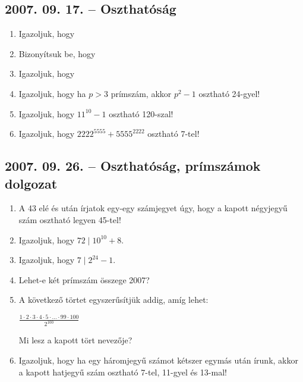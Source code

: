 \subsection*{2007. 09. 17. -- Oszthatóság}
\begin{enumerate}
\item Igazoljuk, hogy
\item Bizonyítsuk be, hogy
\item Igazoljuk, hogy
\item Igazoljuk, hogy ha $p>3$ prímszám, akkor $p^2-1$ osztható 24-gyel!
\item Igazoljuk, hogy $11^{10}-1$ osztható 120-szal!
\item Igazoljuk, hogy $2222^{5555}+5555^{2222}$ osztható 7-tel!
\end{enumerate}


\subsection*{2007. 09. 26. -- Oszthatóság, prímszámok dolgozat}
\begin{enumerate}
\item A 43 elé és után írjatok egy-egy számjegyet úgy, hogy a kapott négyjegyű szám osztható legyen 45-tel!
\item Igazoljuk, hogy $72 \mid 10^{10}+8$.
\item Igazoljuk, hogy $7 \mid 2^{24}-1$.
\item Lehet-e két prímszám összege 2007?
\item A következő törtet egyszerűsítjük addig, amíg lehet:

\begin{center}
$\displaystyle{\frac{1\cdot2\cdot3\cdot4\cdot5\cdot\ldots\cdot99\cdot100}{2^{100}}}$
\end{center}

Mi lesz a kapott tört nevezője?
\item Igazoljuk, hogy ha egy háromjegyű számot kétszer egymás után írunk, akkor a kapott hatjegyű szám osztható 7-tel, 11-gyel és 13-mal!
\end{enumerate}


